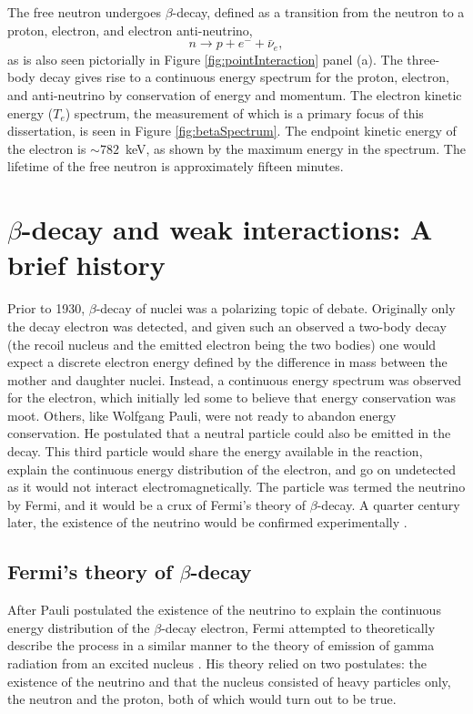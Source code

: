 The free neutron undergoes $\beta$-decay, defined as a transition from the neutron
to a proton, electron, and electron anti-neutrino,
\begin{equation*}
  n\rightarrow p + e^- + \bar{\nu}_{e},
\end{equation*}
\noindent as is also seen pictorially in Figure \ref{fig:pointInteraction} panel (a).
The three-body decay gives rise to a continuous energy spectrum
for the proton, electron, and anti-neutrino by conservation of energy and momentum.
The electron kinetic energy ($T_e$) spectrum, the measurement of which is a primary focus of this
dissertation, is seen in Figure \ref{fig:betaSpectrum}. The endpoint kinetic energy of the electron
is $\sim 782$~keV, as shown by the maximum energy in the spectrum. The lifetime of the free neutron is
approximately fifteen minutes.


\section{$\beta$-decay and weak interactions: A brief history}

Prior to 1930, $\beta$-decay of nuclei was a polarizing topic of debate. Originally
only the decay electron was detected, and given such an observed a two-body decay (the recoil
nucleus and the emitted electron being the two bodies) one would expect a discrete
electron energy defined by the difference in mass between the mother and daughter
nuclei. Instead, a continuous energy spectrum was observed for the electron, which
initially led some to believe that energy conservation was moot. Others, like
Wolfgang Pauli, were not ready
to abandon energy conservation. He postulated that a neutral particle
could also be emitted in the decay. This third particle would share the energy available
in the reaction, explain the continuous energy distribution of the electron, and go
on undetected as it would not interact electromagnetically. The particle was termed
the neutrino by Fermi, and it would be a crux of Fermi's theory of $\beta$-decay.
A quarter century later, the existence of the neutrino would be confirmed
experimentally \cite{cowan1956detection}.

\subsection{Fermi's theory of $\beta$-decay}
After Pauli postulated the existence of the neutrino to explain the continuous energy
distribution of the $\beta$-decay electron, Fermi attempted to theoretically describe
the process in a similar manner to the theory of emission of
gamma radiation from an excited nucleus \cite{fermi1934,wilson1968fermi}.
His theory relied on two postulates: the existence of the neutrino and that the nucleus consisted
of heavy particles only, the neutron and the proton, both of which would turn out to be true.

